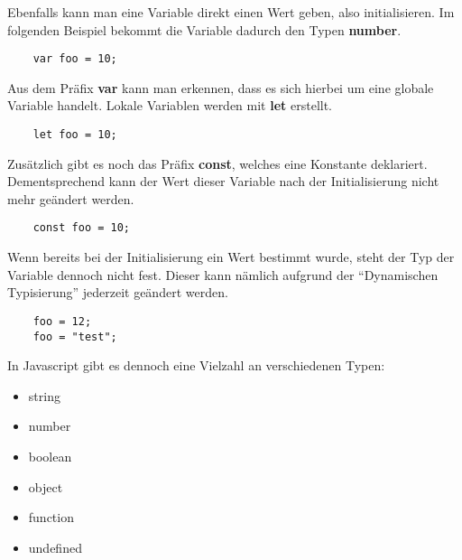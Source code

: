 Ebenfalls kann man eine Variable direkt einen Wert geben, also initialisieren. Im folgenden Beispiel bekommt die Variable dadurch den Typen \textbf{number}.

\begin{lstlisting}
    var foo = 10;
\end{lstlisting}

Aus dem Präfix \textbf{var} kann man erkennen, dass es sich hierbei um eine globale Variable handelt. Lokale Variablen werden mit \textbf{let} erstellt.

\begin{lstlisting}
    let foo = 10;
\end{lstlisting}

Zusätzlich gibt es noch das Präfix \textbf{const}, welches eine Konstante deklariert. Dementsprechend kann der Wert dieser Variable nach der Initialisierung nicht mehr geändert werden.

\begin{lstlisting}
    const foo = 10;
\end{lstlisting}

Wenn bereits bei der Initialisierung ein Wert bestimmt wurde, steht der Typ der Variable dennoch nicht fest. Dieser kann nämlich aufgrund der “Dynamischen Typisierung” jederzeit geändert werden.

\begin{lstlisting}
    foo = 12;
    foo = "test";
\end{lstlisting}

In Javascript gibt es dennoch eine Vielzahl an verschiedenen Typen:

\begin{itemize}
  \item string
  \item number
  \item boolean
  \item object
  \item function
  \item undefined
\end{itemize}

\cite{frontend_web_javascript}

